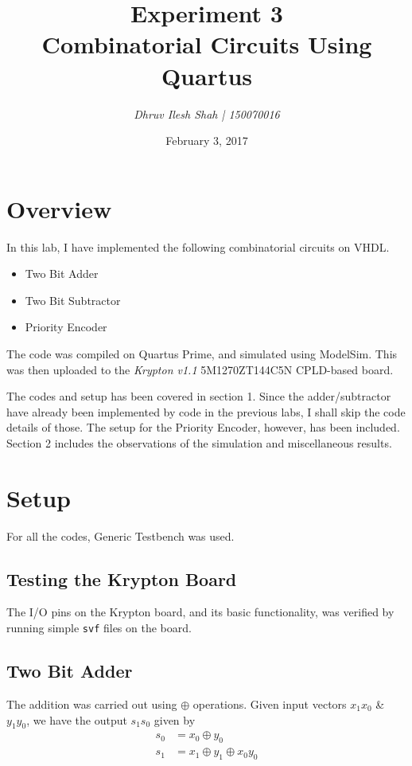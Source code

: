 \documentclass[a4paper, 11pt]{article}
\title{\bf Experiment 3\\\vspace*{2mm} Combinatorial Circuits Using Quartus}
\author{\it Dhruv Ilesh Shah | 150070016}
\date{February 3, 2017}
\begin{document}
\maketitle
\section*{Overview}
In this lab, I have implemented the following combinatorial circuits on VHDL.
\begin{itemize}
	\item Two Bit Adder
	\item Two Bit Subtractor
	\item Priority Encoder
\end{itemize}
The code was compiled on Quartus Prime, and simulated using ModelSim. This was then uploaded to the {\em Krypton v1.1} 5M1270ZT144C5N CPLD-based board.

The codes and setup has been covered in section 1. Since the adder/subtractor have already been implemented by code in the previous labs, I shall skip the code details of those. The setup for the Priority Encoder, however, has been included. Section 2 includes the observations of the simulation and miscellaneous results.
\section{Setup}
For all the codes, Generic Testbench was used.

\subsection{Testing the Krypton Board}
The I/O pins on the Krypton board, and its basic functionality, was verified by running simple \texttt{svf} files on the board.

\subsection{Two Bit Adder}

The addition was carried out using $\oplus$ operations. Given input vectors $x_1x_0$ \& $y_1y_0$, we have the output $s_1s_0$ given by
\begin{equation}
\begin{split}
s_0 &= x_0 \oplus y_0 \\
s_1 &= x_1 \oplus y_1 \oplus x_0y_0
\end{split}
\end{equation}
\end{document}
